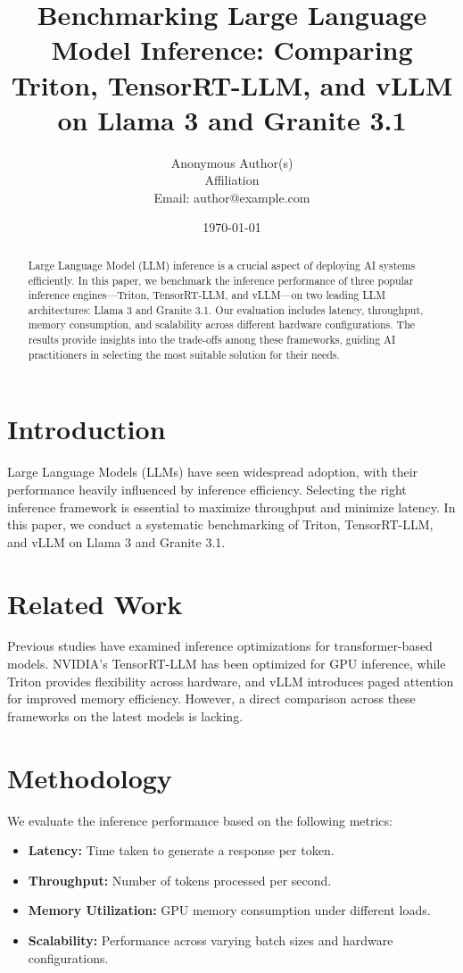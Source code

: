 \documentclass{article}
\title{Benchmarking Large Language Model Inference: Comparing Triton, TensorRT-LLM, and vLLM on Llama 3 and Granite 3.1}
\author{Anonymous Author(s)\\
Affiliation\\
Email: author@example.com}
\date{\today}
\begin{document}
\maketitle

\begin{abstract}
Large Language Model (LLM) inference is a crucial aspect of deploying AI systems efficiently. In this paper, we benchmark the inference performance of three popular inference engines—Triton, TensorRT-LLM, and vLLM—on two leading LLM architectures: Llama 3 and Granite 3.1. Our evaluation includes latency, throughput, memory consumption, and scalability across different hardware configurations. The results provide insights into the trade-offs among these frameworks, guiding AI practitioners in selecting the most suitable solution for their needs.
\end{abstract}

\section{Introduction}
Large Language Models (LLMs) have seen widespread adoption, with their performance heavily influenced by inference efficiency. Selecting the right inference framework is essential to maximize throughput and minimize latency. In this paper, we conduct a systematic benchmarking of Triton, TensorRT-LLM, and vLLM on Llama 3 and Granite 3.1.

\section{Related Work}
Previous studies have examined inference optimizations for transformer-based models. NVIDIA's TensorRT-LLM has been optimized for GPU inference, while Triton provides flexibility across hardware, and vLLM introduces paged attention for improved memory efficiency. However, a direct comparison across these frameworks on the latest models is lacking.

\section{Methodology}
We evaluate the inference performance based on the following metrics:
\begin{itemize}
    \item \textbf{Latency:} Time taken to generate a response per token.
    \item \textbf{Throughput:} Number of tokens processed per second.
    \item \textbf{Memory Utilization:} GPU memory consumption under different loads.
    \item \textbf{Scalability:} Performance across varying batch sizes and hardware configurations.
\end{itemize}
\end{document}
